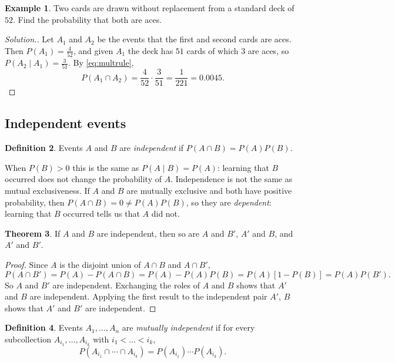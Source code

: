 \documentclass[12pt,a4paper]{report}
\theoremstyle{definition}
\newtheorem{thm}{Theorem}[section]
\newtheorem{definition}[thm]{Definition}
\newtheorem{example}[thm]{Example}
\theoremstyle{plain}
\theoremstyle{definition}
\newenvironment{solution}
  {\renewcommand{\qedsymbol}{}\begin{proof}[\textit{Solution}.]}
  {\end{proof}}
\begin{document}
\begin{example}
\label{ex:twocards}
Two cards are drawn without replacement from a standard deck of $52$. Find the
probability that both are aces.
\end{example}

\begin{solution}
Let $A_1$ and $A_2$ be the events that the first and second cards are aces. Then
$P(A_1) = \frac{4}{52}$, and given $A_1$ the deck has $51$ cards of which $3$ are aces,
so $P(A_2\mid A_1) = \frac{3}{51}$. By \eqref{eq:multrule},
\[P(A_1\cap A_2) = \frac{4}{52}\cdot\frac{3}{51} = \frac{1}{221} = 0.0045 .\]
\end{solution}

\subsection{Independent events}

\begin{definition}
\label{def:independent}
Events $A$ and $B$ are \emph{independent} if $P(A\cap B) = P(A)P(B)$.
\end{definition}

When $P(B)>0$ this is the same as $P(A\mid B) = P(A)$: learning that $B$ occurred
does not change the probability of $A$. Independence is not the same as mutual
exclusiveness. If $A$ and $B$ are mutually exclusive and both have positive
probability, then $P(A\cap B) = 0\ne P(A)P(B)$, so they are \emph{dependent}: learning
that $B$ occurred tells us that $A$ did not.

\begin{thm}
\label{thm:indepcomplements}
If $A$ and $B$ are independent, then so are $A$ and $B'$, $A'$ and $B$, and $A'$ and
$B'$.
\end{thm}

\begin{proof}
Since $A$ is the disjoint union of $A\cap B$ and $A\cap B'$,
\[P(A\cap B') = P(A) - P(A\cap B) = P(A) - P(A)P(B) = P(A)\left[1 - P(B)\right] = P(A)P(B').\]
So $A$ and $B'$ are independent. Exchanging the roles of $A$ and $B$ shows that $A'$
and $B$ are independent. Applying the first result to the independent pair $A'$, $B$
shows that $A'$ and $B'$ are independent.
\end{proof}

\begin{definition}
\label{def:mutualindep}
Events $A_1, \dots, A_n$ are \emph{mutually independent} if for every subcollection
$A_{i_1}, \dots, A_{i_k}$ with $i_1<\dots<i_k$,
\[P(A_{i_1}\cap\cdots\cap A_{i_k}) = P(A_{i_1})\cdots P(A_{i_k}).\]
\end{definition}
\end{document}
